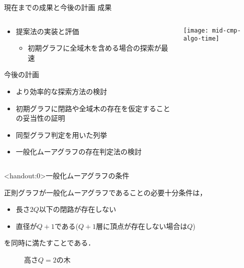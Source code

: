\begin{frame}{現在までの成果と今後の計画}
成果
\begin{columns}
\begin{column}{.48\textwidth}
\begin{itemize}
\item 提案法の実装と評価
\begin{itemize}
      \item 初期グラフに全域木を含める場合の探索が最速
      \end{itemize}
\end{itemize}
今後の計画
  \begin{itemize}
  \item より効率的な探索方法の検討
  \item 初期グラフに閉路や全域木の存在を仮定することの妥当性の証明
  \item 同型グラフ判定を用いた列挙
  \item 一般化ムーアグラフの存在判定法の検討
\end{itemize}
\end{column}
\begin{column}{.5\textwidth}
    \texttt{[image: mid-cmp-algo-time]}
      \label{fig:result}
    \end{column}
\end{columns}
\end{frame}

\appendix
\begin{frame}<handout:0>{一般化ムーアグラフの条件}
  \begin{thm}
    正則グラフが一般化ムーアグラフであることの必要十分条件は，
    \begin{itemize}
    \item 長さ$2Q$以下の閉路が存在しない
    \item 直径が$Q+1$である($Q+1$層に頂点が存在しない場合は$Q$)
    \end{itemize}
    を同時に満たすことである．
  \end{thm}
  \begin{figure}
    \centering
    \def\svgwith{.4\textwidth}
    \resizebox{.4\textwidth}{!}{
      
    }
    \caption{高さ$Q=2$の木}
  \end{figure}
\end{frame}

